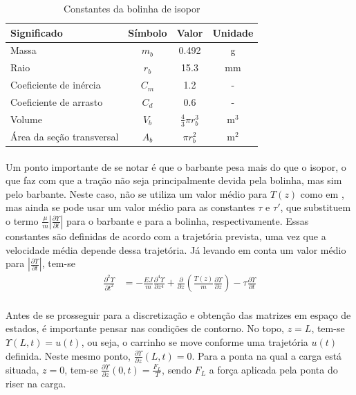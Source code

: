 \begin{table}[!ht]
	\centering
	\begin{tabular}{|l|c|c|c|}
		\hline
		\textbf{Significado} & \textbf{Símbolo} & \textbf{Valor} & \textbf{Unidade}\\ \hline \hline
		Massa & $m_{b}$ & 0.492 & g\\ \hline
		Raio & $r_{b}$ & 15.3 & mm\\ \hline
		Coeficiente de inércia & $C_m$ & 1.2 & - \\ \hline
		Coeficiente de arrasto & $C_d$ & 0.6 & - \\ \hline
		Volume & $V_b$ & $\frac{4}{3}\pi r_b^3$ & $\textrm{m}^3$ \\ \hline
		Área da seção transversal & $A_b$ & $\pi r_b^2$ & m$^2$\\ \hline
	\end{tabular}
	\caption{Constantes da bolinha de isopor\label{constanteIsopor}}
\end{table}


\paragraph{} Um ponto importante de se notar é que o barbante pesa mais do que o isopor, o que faz com que a tração não seja principalmente devida pela bolinha, mas sim pelo barbante. Neste caso, não se utiliza um valor médio para $T(z)$ como em \cite{fabricioIFAC}, mas ainda se pode usar um valor médio para as constantes $\tau$ e $\tau'$, que substituem o termo $\frac{\mu}{m}\left|\frac{\partial \Upsilon}{\partial t}\right|$ para o barbante e para a bolinha, respectivamente. Essas constantes são definidas de acordo com a trajetória prevista, uma vez que a velocidade média depende dessa trajetória. Já levando em conta um valor médio para $\left|\frac{\partial \Upsilon}{\partial t}\right|$, tem-se \begin{align}
	\frac{\partial^2 \Upsilon}{\partial t^2} &= -\frac{EJ}{m}\frac{\partial^4 \Upsilon}{\partial z^4} + \frac{\partial}{\partial z}\left(\frac{T(z)}{m}\frac{\partial \Upsilon}{\partial z}\right) - \tau\frac{\partial \Upsilon}{\partial t}\label{EquacaoComTau}
	\end{align}

\paragraph{} Antes de se prosseguir para a discretização e obtenção das matrizes em espaço de estados, é importante pensar nas condições de contorno. No topo, $z=L$, tem-se $\Upsilon(L,t)=u(t)$, ou seja, o carrinho se move conforme uma trajetória $u(t)$ definida. Neste mesmo ponto, $\frac{\partial\Upsilon}{\partial z}(L,t) = 0$. Para a ponta na qual a carga está situada, $z=0$, tem-se $\frac{\partial\Upsilon}{\partial z}(0,t) = \frac{F_L}{T}$, sendo $F_L$ a força aplicada pela ponta do riser na carga.

